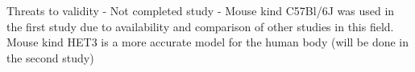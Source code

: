 Threats to validity
- Not completed study
- Mouse kind C57Bl/6J was used in the first study due to availability and comparison of other studies in this field. Mouse kind HET3 is a more accurate model for the human body (will be done in the second study)